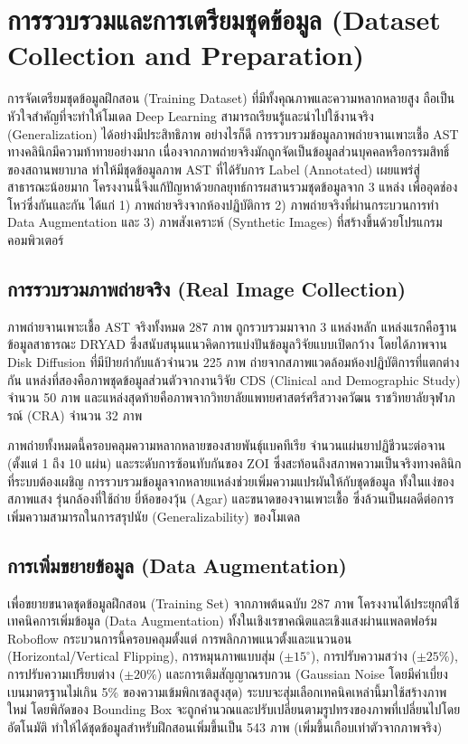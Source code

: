 \section{การรวบรวมและการเตรียมชุดข้อมูล (Dataset Collection and Preparation)}

การจัดเตรียมชุดข้อมูลฝึกสอน (Training Dataset) ที่มีทั้งคุณภาพและความหลากหลายสูง ถือเป็นหัวใจสำคัญที่จะทำให้โมเดล Deep Learning สามารถเรียนรู้และนำไปใช้งานจริง (Generalization) ได้อย่างมีประสิทธิภาพ อย่างไรก็ดี การรวบรวมข้อมูลภาพถ่ายจานเพาะเชื้อ AST ทางคลินิกมีความท้าทายอย่างมาก เนื่องจากภาพถ่ายจริงมักถูกจัดเป็นข้อมูลส่วนบุคคลหรือกรรมสิทธิ์ของสถานพยาบาล ทำให้มีชุดข้อมูลภาพ AST ที่ได้รับการ Label (Annotated) เผยแพร่สู่สาธารณะน้อยมาก โครงงานนี้จึงแก้ปัญหาด้วยกลยุทธ์การผสานรวมชุดข้อมูลจาก 3 แหล่ง เพื่ออุดช่องโหว่ซึ่งกันและกัน ได้แก่ 1) ภาพถ่ายจริงจากห้องปฏิบัติการ 2) ภาพถ่ายจริงที่ผ่านกระบวนการทำ Data Augmentation และ 3) ภาพสังเคราะห์ (Synthetic Images) ที่สร้างขึ้นด้วยโปรแกรมคอมพิวเตอร์

\subsection{การรวบรวมภาพถ่ายจริง (Real Image Collection)}

ภาพถ่ายจานเพาะเชื้อ AST จริงทั้งหมด 287 ภาพ ถูกรวบรวมมาจาก 3 แหล่งหลัก แหล่งแรกคือฐานข้อมูลสาธารณะ DRYAD \cite{giske2024dryad} ซึ่งสนับสนุนแนวคิดการแบ่งปันข้อมูลวิจัยแบบเปิดกว้าง \cite{iom1996} โดยได้ภาพจาน Disk Diffusion ที่มีป้ายกำกับแล้วจำนวน 225 ภาพ ถ่ายจากสภาพแวดล้อมห้องปฏิบัติการที่แตกต่างกัน แหล่งที่สองคือภาพชุดข้อมูลส่วนตัวจากงานวิจัย CDS (Clinical and Demographic Study) จำนวน 50 ภาพ และแหล่งสุดท้ายคือภาพจากวิทยาลัยแพทยศาสตร์ศรีสวางควัฒน ราชวิทยาลัยจุฬาภรณ์ (CRA) จำนวน 32 ภาพ

ภาพถ่ายทั้งหมดนี้ครอบคลุมความหลากหลายของสายพันธุ์แบคทีเรีย จำนวนแผ่นยาปฏิชีวนะต่อจาน (ตั้งแต่ 1 ถึง 10 แผ่น) และระดับการซ้อนทับกันของ ZOI ซึ่งสะท้อนถึงสภาพความเป็นจริงทางคลินิกที่ระบบต้องเผชิญ การรวบรวมข้อมูลจากหลายแหล่งช่วยเพิ่มความแปรผันให้กับชุดข้อมูล ทั้งในแง่ของสภาพแสง รุ่นกล้องที่ใช้ถ่าย ยี่ห้อของวุ้น (Agar) และขนาดของจานเพาะเชื้อ ซึ่งล้วนเป็นผลดีต่อการเพิ่มความสามารถในการสรุปนัย (Generalizability) ของโมเดล

\subsection{การเพิ่มขยายข้อมูล (Data Augmentation)}

เพื่อขยายขนาดชุดข้อมูลฝึกสอน (Training Set) จากภาพต้นฉบับ 287 ภาพ โครงงานได้ประยุกต์ใช้เทคนิคการเพิ่มข้อมูล (Data Augmentation) ทั้งในเชิงเรขาคณิตและเชิงแสงผ่านแพลตฟอร์ม Roboflow \cite{roboflow} กระบวนการนี้ครอบคลุมตั้งแต่ การพลิกภาพแนวตั้งและแนวนอน (Horizontal/Vertical Flipping), การหมุนภาพแบบสุ่ม ($\pm 15^\circ$), การปรับความสว่าง ($\pm 25\%$), การปรับความเปรียบต่าง ($\pm 20\%$) และการเติมสัญญาณรบกวน (Gaussian Noise โดยมีค่าเบี่ยงเบนมาตรฐานไม่เกิน 5\% ของความเข้มพิกเซลสูงสุด) ระบบจะสุ่มเลือกเทคนิคเหล่านี้มาใช้สร้างภาพใหม่ โดยพิกัดของ Bounding Box จะถูกคำนวณและปรับเปลี่ยนตามรูปทรงของภาพที่เปลี่ยนไปโดยอัตโนมัติ ทำให้ได้ชุดข้อมูลสำหรับฝึกสอนเพิ่มขึ้นเป็น 543 ภาพ (เพิ่มขึ้นเกือบเท่าตัวจากภาพจริง)

